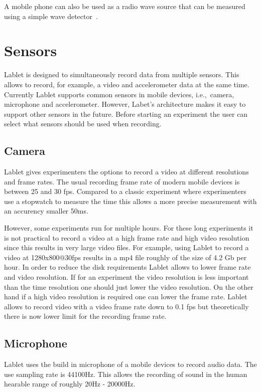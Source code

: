 \documentclass{sigchi}
\newcommand{\ie}{i.e.,\ }
\begin{document}
A mobile phone can also be used as a radio wave source that can be measured using a simple wave detector~\cite{Hare2010}.

\section{Sensors}
Lablet is designed to simultaneously record data from multiple sensors.
This allows to record, for example, a video and accelerometer data at the same time.
Currently Lablet supports common sensors in mobile devices, \ie camera, microphone and accelerometer.
However, Labet's architecture makes it easy to support other sensors in the future.
Before starting an experiment the user can select what sensors should be used when recording.

\subsection{Camera}
Lablet gives experimenters the options to record a video at different resolutions and frame rates.
The usual recording frame rate of modern mobile devices is between 25 and 30 fps.
Compared to a classic experiment where experimenters use a stopwatch to measure the time this allows a more precise measurement with an accurency smaller 50ms.

However, some experiments run for multiple hours.
For these long experiments it is not practical to record a video at a high frame rate and high video resolution since this results in very large video files.
For example, using Lablet to record a video at 1280x800@30fps results in a mp4 file roughly of the size of 4.2 Gb per hour.
In order to reduce the disk requirements Lablet allows to lower frame rate and video resolution.
If for an experiment the video resolution is less important than the time resolution one should just lower the video resolution.
On the other hand if a high video resolution is required one can lower the frame rate.
Lablet allows to record video with a video frame rate down to 0.1 fps but theoretically there is now lower limit for the recording frame rate.

\subsection{Microphone}
Lablet uses the build in microphone of a mobile devices to record audio data.
The use sampling rate is 44100Hz.
This allows the recording of sound in the human hearable range of roughly 20Hz - 20000Hz.
\end{document}
